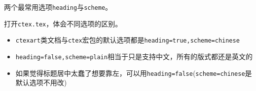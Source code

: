 \begin{frame}
	两个最常用选项\texttt{heading}与\texttt{scheme}。

	打开\texttt{ctex.tex}，体会不同选项的区别。
	\begin{itemize}
		\item \texttt{ctexart}类文档与\texttt{ctex}宏包的默认选项都是\texttt{heading=true,scheme=chinese}
		\item \texttt{heading=false,scheme=plain}相当于只是支持中文，所有的版式都还是英文的
		\item 如果觉得标题居中太蠢了想要靠左，可以用\texttt{heading=false}(\texttt{scheme=chinese}是默认选项不用改)
	\end{itemize}
\end{frame}